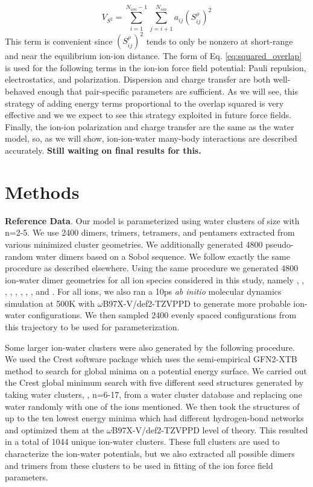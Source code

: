 \documentclass[journal=jctcce,manuscript=article]{achemso}
\begin{document}
\begin{equation}  V_{S^2}=\sum_{i=1}^{N_{ion}-1}\sum_{j=i+1}^{N_{ion}}a_{ij}(S_{ij}^\rho)^2
  \label{eq:squared_overlap}
\end{equation}
\noindent
This term is convenient since $(S_{ij}^\rho)^2$ tends to only be nonzero at short-range and near the equilibrium ion-ion distance. The form of Eq. \ref{eq:squared_overlap} is used for the following terms in the ion-ion force field potential: Pauli repulsion, electrostatics, and polarization. Dispersion and charge transfer are both well-behaved enough that pair-specific parameters are sufficient. As we will see, this strategy of adding energy terms proportional to the overlap squared is very effective and we we expect to see this strategy exploited in future force fields. Finally, the ion-ion polarization and charge transfer are the same as the water model, so, as we will show, ion-ion-water many-body interactions are described accurately. \textbf{Still waiting on final results for this.}

\section*{Methods}
\textbf{Reference Data}. Our model is parameterized using water clusters of size  with n=2-5. We use 2400 dimers, trimers, tetramers, and pentamers extracted from various minimized cluster geometries. We additionally generated 4800 pseudo-random water dimers based on a Sobol sequence. We follow exactly the same procedure as described elsewhere.\cite{misquitta2008first} Using the same procedure we generated 4800 ion-water dimer geometries for all ion species considered in this study, namely , , , , , , , , and . For all ions, we also ran a 10ps \textit{ab initio} molecular dynamics simulation at 500K with $\omega$B97X-V/def2-TZVPPD to generate more probable ion-water configurations. We then sampled 2400 evenly spaced configurations from this trajectory to be used for parameterization.

Some larger ion-water clusters were also generated by the following procedure. We used the Crest software package\cite{pracht2020automated} which uses the semi-empirical GFN2-XTB\cite{bannwarth2019gfn2} method to search for global minima on a potential energy surface. We carried out the Crest global minimum search with five different seed structures generated by taking water clusters, , n=6-17, from a water cluster database\cite{rakshit2019atlas} and replacing one water randomly with one of the ions mentioned. We then took the structures of up to the ten lowest energy minima which had different hydrogen-bond networks and optimized them at the $\omega$B97X-V/def2-TZVPPD level of theory. This resulted in a total of 1044 unique ion-water clusters. These full clusters are used to characterize the ion-water potentials, but we also extracted all possible dimers and trimers from these clusters to be used in fitting of the ion force field parameters.
\end{document}
